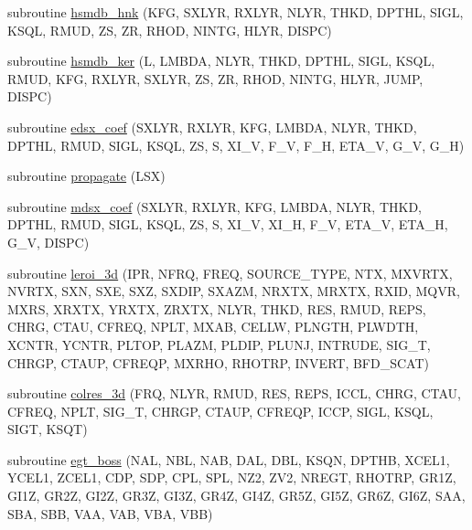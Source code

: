 \begin{DoxyCompactItemize}
subroutine \hyperlink{Leroi__c_8f90_a5f1c5171e9808d392bd660bf9b9ed928}{hsmdb\+\_\+hnk} (K\+FG, S\+X\+L\+YR, R\+X\+L\+YR, N\+L\+YR, T\+H\+KD, D\+P\+T\+HL, S\+I\+GL, K\+S\+QL, R\+M\+UD, ZS, ZR, R\+H\+OD, N\+I\+N\+TG, H\+L\+YR, D\+I\+S\+PC)
\item 
subroutine \hyperlink{Leroi__c_8f90_a9f61ced82ed6f25a1f5f66c18711044a}{hsmdb\+\_\+ker} (L, L\+M\+B\+DA, N\+L\+YR, T\+H\+KD, D\+P\+T\+HL, S\+I\+GL, K\+S\+QL, R\+M\+UD, K\+FG, R\+X\+L\+YR, S\+X\+L\+YR, ZS, ZR, R\+H\+OD, N\+I\+N\+TG, H\+L\+YR, J\+U\+MP, D\+I\+S\+PC)
\item 
subroutine \hyperlink{Leroi__c_8f90_a2ffa10f72b064e2c52fb28da1b335098}{edsx\+\_\+coef} (S\+X\+L\+YR, R\+X\+L\+YR, K\+FG, L\+M\+B\+DA, N\+L\+YR, T\+H\+KD, D\+P\+T\+HL, R\+M\+UD, S\+I\+GL, K\+S\+QL, ZS, S, X\+I\+\_\+V, F\+\_\+V, F\+\_\+H, E\+T\+A\+\_\+V, G\+\_\+V, G\+\_\+H)
\item 
subroutine \hyperlink{Leroi__c_8f90_a5b285692f676003c1a8cae9c7a8017ee}{propagate} (L\+SX)
\item 
subroutine \hyperlink{Leroi__c_8f90_a004c7d5d0aeff550ae33684b04654b48}{mdsx\+\_\+coef} (S\+X\+L\+YR, R\+X\+L\+YR, K\+FG, L\+M\+B\+DA, N\+L\+YR, T\+H\+KD, D\+P\+T\+HL, R\+M\+UD, S\+I\+GL, K\+S\+QL, ZS, S, X\+I\+\_\+V, X\+I\+\_\+H, F\+\_\+V, E\+T\+A\+\_\+V, E\+T\+A\+\_\+H, G\+\_\+V, D\+I\+S\+PC)
\item 
subroutine \hyperlink{Leroi__c_8f90_ad3c98b0aa8032dd5e2c3fce9417d4512}{leroi\+\_\+3d} (I\+PR, N\+F\+RQ, F\+R\+EQ, S\+O\+U\+R\+C\+E\+\_\+\+T\+Y\+PE, N\+TX, M\+X\+V\+R\+TX, N\+V\+R\+TX, S\+XN, S\+XE, S\+XZ, S\+X\+D\+IP, S\+X\+A\+ZM, N\+R\+X\+TX, M\+R\+X\+TX, R\+X\+ID, M\+Q\+VR, M\+X\+RS, X\+R\+X\+TX, Y\+R\+X\+TX, Z\+R\+X\+TX, N\+L\+YR, T\+H\+KD, R\+ES, R\+M\+UD, R\+E\+PS, C\+H\+RG, C\+T\+AU, C\+F\+R\+EQ, N\+P\+LT, M\+X\+AB, C\+E\+L\+LW, P\+L\+N\+G\+TH, P\+L\+W\+D\+TH, X\+C\+N\+TR, Y\+C\+N\+TR, P\+L\+T\+OP, P\+L\+A\+ZM, P\+L\+D\+IP, P\+L\+U\+NJ, I\+N\+T\+R\+U\+DE, S\+I\+G\+\_\+T, C\+H\+R\+GP, C\+T\+A\+UP, C\+F\+R\+E\+QP, M\+X\+R\+HO, R\+H\+O\+T\+RP, I\+N\+V\+E\+RT, B\+F\+D\+\_\+\+S\+C\+AT)
\item 
subroutine \hyperlink{Leroi__c_8f90_a61eed94d3789d0474014a2cd34a792c6}{colres\+\_\+3d} (F\+RQ, N\+L\+YR, R\+M\+UD, R\+ES, R\+E\+PS, I\+C\+CL, C\+H\+RG, C\+T\+AU, C\+F\+R\+EQ, N\+P\+LT, S\+I\+G\+\_\+T, C\+H\+R\+GP, C\+T\+A\+UP, C\+F\+R\+E\+QP, I\+C\+CP, S\+I\+GL, K\+S\+QL, S\+I\+GT, K\+S\+QT)
\item 
subroutine \hyperlink{Leroi__c_8f90_a1b3954d66e2114dd2d6b6a5a44b7f0a4}{egt\+\_\+boss} (N\+AL, N\+BL, N\+AB, D\+AL, D\+BL, K\+S\+QN, D\+P\+T\+HB, X\+C\+E\+L1, Y\+C\+E\+L1, Z\+C\+E\+L1, C\+DP, S\+DP, C\+PL, S\+PL, N\+Z2, Z\+V2, N\+R\+E\+GT, R\+H\+O\+T\+RP, G\+R1Z, G\+I1Z, G\+R2Z, G\+I2Z, G\+R3Z, G\+I3Z, G\+R4Z, G\+I4Z, G\+R5Z, G\+I5Z, G\+R6Z, G\+I6Z, S\+AA, S\+BA, S\+BB, V\+AA, V\+AB, V\+BA, V\+BB)

\end{DoxyCompactItemize}

